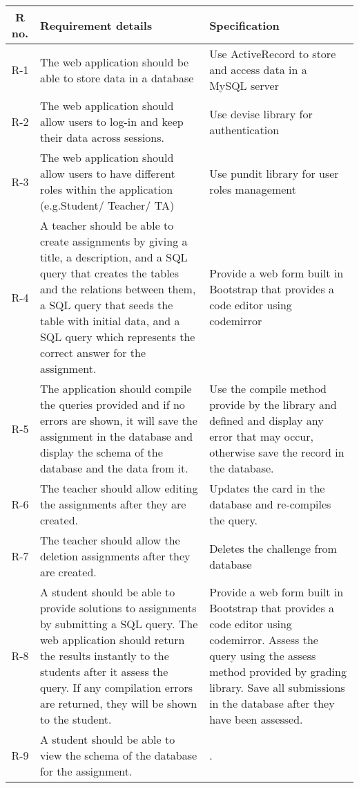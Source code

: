 \begin{tabularx}{\textwidth}{|c|Y|Y|}
  \hline
  \textbf{R no.} & \textbf{Requirement details} & \textbf{Specification} \\\hline
  \endhead
  R-1 & The web application should be able to store data in a database & Use ActiveRecord to store and access data in a MySQL server \\\hline
  R-2 & The web application should allow users to log-in and keep their data across sessions. & Use devise library for authentication \\\hline
  R-3 &  The web application should allow users to have different roles within the application (e.g.Student/ Teacher/ TA) & Use pundit library for user roles management \\\hline
  R-4 &  A teacher should be able to create assignments by giving a title, a description, and a SQL query that creates the tables and the relations between them, a SQL query that seeds the table with initial data, and a SQL query which represents the correct answer for the assignment. & Provide a web form built in Bootstrap that provides a code editor using codemirror \\\hline
  R-5 &  The application should compile the queries provided and if no errors are shown, it will save the assignment in the database and display the schema of the database and the data from it. & Use the compile method provide by the library and defined and display any error that may occur, otherwise save the record in the database. \\\hline
  R-6 & The teacher should allow editing the assignments after they are created. & Updates the card in the database and re-compiles the query. \\\hline
  R-7 & The teacher should allow the deletion assignments after they are created. & Deletes the challenge from database \\\hline
  R-8 & A student should be able to provide solutions to assignments by submitting a SQL query. The web application should return the results instantly to the students after it assess the query. If any compilation errors are returned, they will be shown to the student. & Provide a web form built in Bootstrap that provides a code editor using codemirror. Assess the query using the assess method provided by grading library. Save all submissions in the database after they have been assessed. \\\hline
  R-9 & A student should be able to view the schema of the database for the assignment. & . \\\hline

\end{tabularx}
